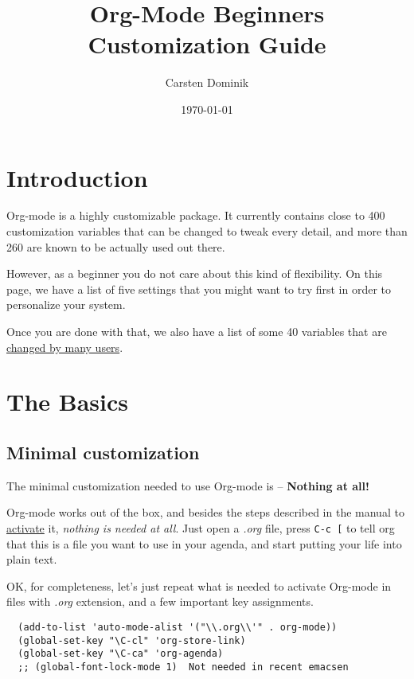 \documentclass[11pt]{article}
\author{Carsten Dominik}
\date{\today}
\title{Org-Mode Beginners Customization Guide}
\begin{document}
\maketitle
\tableofcontents



\section*{Introduction}
\label{sec:org4bd04a6}

Org-mode is a highly customizable package.  It currently contains close to
400 customization variables that can be changed to tweak every detail, and
more than 260 are known to be actually used out there.

However, as a beginner you do not care about this kind of flexibility.  On
this page, we have a list of five settings that you might want to try first
in order to personalize your system.

Once you are done with that, we also have a list of some 40 variables that
are \href{http://orgmode.org/worg/org-configs/org-customization-survey.php}{changed by many users}.

\section*{The Basics}
\label{sec:orga88657a}


\subsection*{Minimal customization}
\label{sec:org6de243d}


The minimal customization needed to use Org-mode is -- \textbf{Nothing at all!}
\par Org-mode works out of the box, and besides the steps described in the
manual to \href{http://orgmode.org/manual/Activation.html\#Activation}{activate} it, \emph{nothing is needed at all}.  Just open a \emph{.org}
file, press \texttt{C-c [} to tell org that this is a file you want to use in your
agenda, and start putting your life into plain text.

OK, for completeness, let's just repeat what is needed to activate
Org-mode in files with \emph{.org} extension, and a few important key
assignments.

\begin{verbatim}
  (add-to-list 'auto-mode-alist '("\\.org\\'" . org-mode))
  (global-set-key "\C-cl" 'org-store-link)
  (global-set-key "\C-ca" 'org-agenda)
  ;; (global-font-lock-mode 1)  Not needed in recent emacsen
\end{verbatim}
\end{document}
